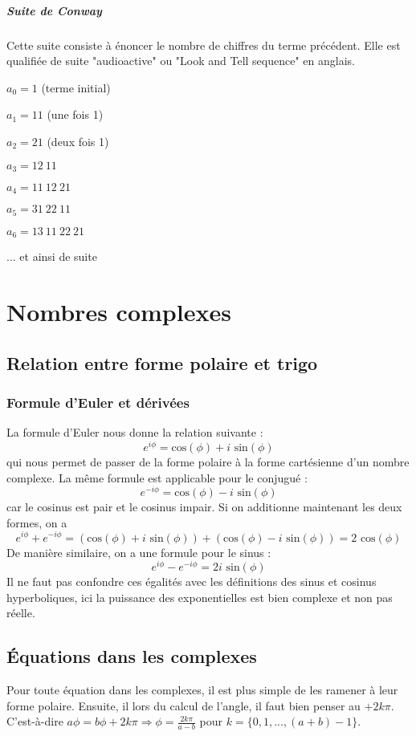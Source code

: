 \documentclass[10pt,a4paper]{book}
\begin{document}
\paragraph{Suite de Conway}
Cette suite consiste à énoncer le nombre de chiffres du terme précédent.  Elle est qualifiée de suite "audioactive" ou "Look and Tell sequence" en anglais.\par 
$a_0 = 1$ (terme initial)\par 
$a_1 = 11$ (une fois 1)\par
$a_2 = 21$ (deux fois 1)\par 
$a_3 = 12\ 11$\par 
$a_4 = 11\ 12\ 21$\par 
$a_5 = 31\ 22\ 11$\par 
$a_6 = 13\ 11\ 22\ 21$\par 
... et ainsi de suite

\chapter{Nombres complexes}
\section{Relation entre forme polaire et trigo}
\subsection{Formule d'Euler et dérivées}
La formule d'Euler nous donne la relation suivante :
\[e^{i\phi} = \text{cos}(\phi)+i\text{ sin}(\phi)\]
qui nous permet de passer de la forme polaire à la forme cartésienne d'un nombre complexe. La même formule est applicable pour le conjugué :
\[e^{-i\phi} = \text{cos}(\phi)-i\text{ sin}(\phi)\]
car le cosinus est pair et le cosinus impair. Si on additionne maintenant les deux formes, on a
\[e^{i\phi}+e^{-i\phi} = (\text{cos}(\phi) + i\text{ sin}(\phi)) + (\text{cos}(\phi) - i\text{ sin}(\phi)) = 2\text{ cos}(\phi)\]
De manière similaire, on a une formule pour le sinus :
\[e^{i\phi}-e^{-i\phi} = 2i\text{ sin}(\phi)\]
Il ne faut pas confondre ces égalités avec les définitions des sinus et cosinus hyperboliques, ici la puissance des exponentielles est bien complexe et non pas réelle.

\section{Équations dans les complexes}
Pour toute équation dans les complexes, il est plus simple de les ramener à leur forme polaire. Ensuite, il lors du calcul de l'angle, il faut bien penser au $+2k\pi$. C'est-à-dire $a\phi = b\phi +2k\pi \Rightarrow \phi = \frac{2k\pi}{a-b}$ pour $k=\{0,1,...,(a+b)-1\}$.
\end{document}

